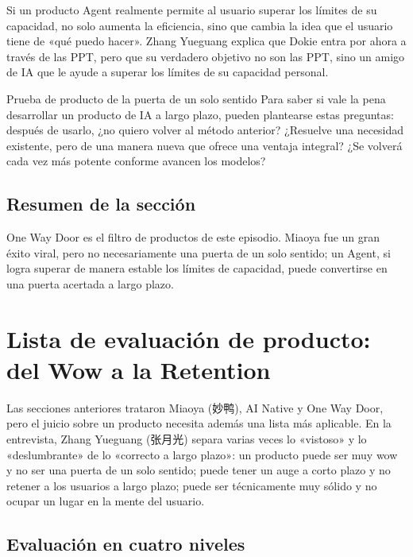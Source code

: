 \documentclass[a4paper]{article}
\begin{document}
Si un producto Agent realmente permite al usuario superar los límites de su capacidad, no solo aumenta la eficiencia, sino que cambia la idea que el usuario tiene de «qué puedo hacer». Zhang Yueguang explica que Dokie entra por ahora a través de las PPT, pero que su verdadero objetivo no son las PPT, sino un amigo de IA que le ayude a superar los límites de su capacidad personal.

\begin{importantbox}{Prueba de producto de la puerta de un solo sentido}
Para saber si vale la pena desarrollar un producto de IA a largo plazo, pueden plantearse estas preguntas: después de usarlo, ¿no quiero volver al método anterior? ¿Resuelve una necesidad existente, pero de una manera nueva que ofrece una ventaja integral? ¿Se volverá cada vez más potente conforme avancen los modelos?
\end{importantbox}

\subsection{Resumen de la sección}

One Way Door es el filtro de productos de este episodio. Miaoya fue un gran éxito viral, pero no necesariamente una puerta de un solo sentido; un Agent, si logra superar de manera estable los límites de capacidad, puede convertirse en una puerta acertada a largo plazo.
\section{Lista de evaluación de producto: del Wow a la Retention}

Las secciones anteriores trataron Miaoya (妙鸭), AI Native y One Way Door, pero el juicio sobre un producto necesita además una lista más aplicable. En la entrevista, Zhang Yueguang (张月光) separa varias veces lo «vistoso» y lo «deslumbrante» de lo «correcto a largo plazo»: un producto puede ser muy wow y no ser una puerta de un solo sentido; puede tener un auge a corto plazo y no retener a los usuarios a largo plazo; puede ser técnicamente muy sólido y no ocupar un lugar en la mente del usuario.

\subsection{Evaluación en cuatro niveles}
\end{document}
